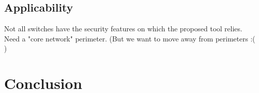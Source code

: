 \documentclass[journal]{IEEEtran}
\begin{document}
\subsection{Applicability}
Not all switches have the security features on which the proposed tool relies.
Need a "core network" perimeter. (But we want to move away from perimeters :( )


\section{Conclusion}










\end{document}
